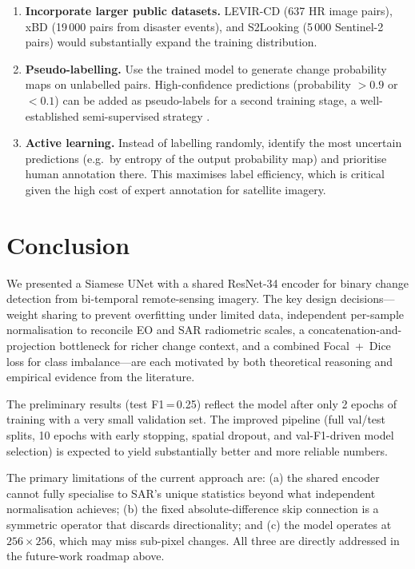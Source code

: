 \documentclass[12pt,a4paper]{article}
\begin{document}
\begin{enumerate}[leftmargin=*]
  \item \textbf{Incorporate larger public datasets.}  LEVIR-CD \citep{chen2020levir}
    (637 HR image pairs), xBD \citep{gupta2019xbd} (19\,000 pairs from disaster events),
    and S2Looking \citep{shen2021s2looking} (5\,000 Sentinel-2 pairs) would substantially
    expand the training distribution.

  \item \textbf{Pseudo-labelling.}  Use the trained model to generate change probability
    maps on unlabelled pairs.  High-confidence predictions (probability $>0.9$ or $<0.1$)
    can be added as pseudo-labels for a second training stage, a well-established
    semi-supervised strategy \citep{lee2013pseudo}.

  \item \textbf{Active learning.}  Instead of labelling randomly, identify the most
    uncertain predictions (e.g.\ by entropy of the output probability map) and prioritise
    human annotation there.  This maximises label efficiency, which is critical given the
    high cost of expert annotation for satellite imagery.
\end{enumerate}

\section{Conclusion}

We presented a Siamese UNet with a shared ResNet-34 encoder for binary change detection
from bi-temporal remote-sensing imagery.  The key design decisions---weight sharing to
prevent overfitting under limited data, independent per-sample normalisation to reconcile
EO and SAR radiometric scales, a concatenation-and-projection bottleneck for richer
change context, and a combined Focal~+~Dice loss for class imbalance---are each motivated
by both theoretical reasoning and empirical evidence from the literature.

The preliminary results (test F1\,=\,0.25) reflect the model after only 2 epochs of
training with a very small validation set.  The improved pipeline (full val/test splits,
10 epochs with early stopping, spatial dropout, and val-F1-driven model selection) is
expected to yield substantially better and more reliable numbers.

The primary limitations of the current approach are: (a) the shared encoder cannot
fully specialise to SAR's unique statistics beyond what independent normalisation
achieves; (b) the fixed absolute-difference skip connection is a symmetric operator that
discards directionality; and (c) the model operates at $256\times256$, which may miss
sub-pixel changes.  All three are directly addressed in the future-work roadmap above.
\end{document}
